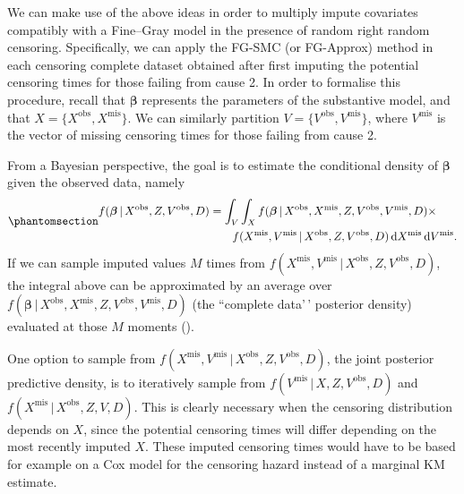 \documentclass[
  letterpaper,
  paper=240mm:170mm,
  twoside=true,
  open=right,
  fontsize=10pt,
  pagesize=false,
  BCOR=15mm,
  DIV=14,
  headinclude=true,
  footinclude=false,
  headsepline=on]{scrbook}
\newcommand{\given}{\,|\,}
\newcommand\diff{\mathop{}\!\mathrm{d}}
\begin{document}
We can make use of the above ideas in order to multiply impute
covariates compatibly with a Fine--Gray model in the presence of random
right random censoring. Specifically, we can apply the FG-SMC (or
FG-Approx) method in each censoring complete dataset obtained after
first imputing the potential censoring times for those failing from
cause 2. In order to formalise this procedure, recall that
\(\boldsymbol{\beta}\) represents the parameters of the substantive
model, and that \(X = \{X^{\text{obs}},X^{\text{mis}}\}\). We can
similarly partition \(V = \{V^{\text{obs}},V^{\text{mis}}\}\), where
\(V^{\text{mis}}\) is the vector of missing censoring times for those
failing from cause 2.

From a Bayesian perspective, the goal is to estimate the conditional
density of \(\boldsymbol{\beta}\) given the observed data, namely
\begin{equation}\phantomsection\label{eq-posterior-beta}{
\begin{aligned}
    f(\boldsymbol{\beta} \given X^{\text{obs}},Z,V^{\text{obs}},D) &= \int_V \int_X f(\boldsymbol{\beta} \given X^{\text{obs}},X^{\text{mis}},Z,V^{\text{obs}},V^{\text{mis}},D) \times  \\ 
    &\qquad f(X^{\text{mis}}, V^{\text{mis}} \given X^{\text{obs}},Z,V^{\text{obs}},D)\diff X^{\text{mis}}\diff V^{\text{mis}}. 
\end{aligned} 
}\end{equation} If we can sample imputed values \(M\) times from
\(f(X^{\text{mis}}, V^{\text{mis}} \given X^{\text{obs}},Z,V^{\text{obs}},D)\),
the integral above can be approximated by an average over
\(f(\boldsymbol{\beta} \given X^{\text{obs}},X^{\text{mis}},Z,V^{\text{obs}},V^{\text{mis}},D)\)
(the ``complete data'\,' posterior density) evaluated at those \(M\)
moments ().

One option to sample from
\(f(X^{\text{mis}}, V^{\text{mis}} \given X^{\text{obs}},Z,V^{\text{obs}},D)\),
the joint posterior predictive density, is to iteratively sample from
\(f(V^{\text{mis}} \given X,Z,V^{\text{obs}},D)\) and
\(f(X^{\text{mis}} \given X^{\text{obs}},Z,V,D)\). This is clearly
necessary when the censoring distribution depends on \(X\), since the
potential censoring times will differ depending on the most recently
imputed \(X\). These imputed censoring times would have to be based for
example on a Cox model for the censoring hazard instead of a marginal KM
estimate.
\end{document}
